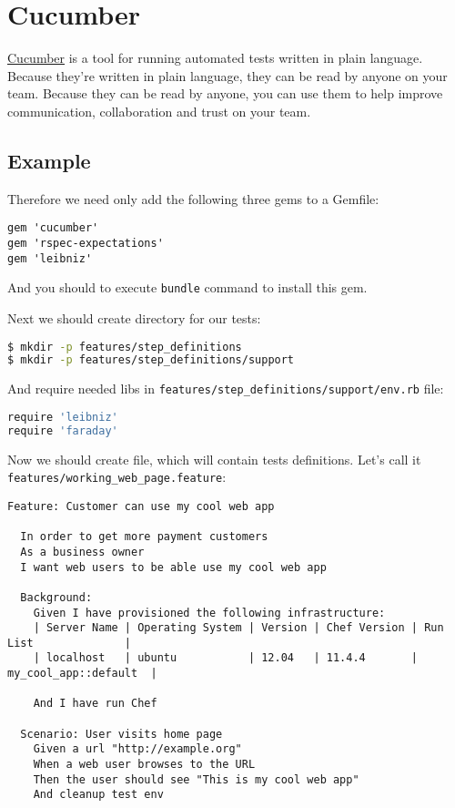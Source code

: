 \section{Cucumber}
\label{sec:testing-cucumber-spec}

\href{http://cukes.info/}{Cucumber} is a tool for running automated tests written in plain language. Because they're written in plain language, they can be read by anyone on your team. Because they can be read by anyone, you can use them to help improve communication, collaboration and trust on your team.

\subsection{Example}

Therefore we need only add the following three gems to a Gemfile:

\begin{lstlisting}[label=lst:testing-cucumber-spec1]
gem 'cucumber'
gem 'rspec-expectations'
gem 'leibniz'
\end{lstlisting}

And you should to execute \lstinline!bundle! command to install this gem.

Next we should create directory for our tests:

\begin{lstlisting}[language=Bash,label=lst:testing-cucumber-spec2]
$ mkdir -p features/step_definitions
$ mkdir -p features/step_definitions/support
\end{lstlisting}

And require needed libs in \lstinline!features/step_definitions/support/env.rb! file:

\begin{lstlisting}[language=Bash,label=lst:testing-cucumber-spec3]
require 'leibniz'
require 'faraday'
\end{lstlisting}

Now we should create file, which will contain tests definitions. Let's call it \lstinline!features/working_web_page.feature!:

\begin{lstlisting}[label=lst:testing-cucumber-spec4]
Feature: Customer can use my cool web app

  In order to get more payment customers
  As a business owner
  I want web users to be able use my cool web app

  Background:
    Given I have provisioned the following infrastructure:
    | Server Name | Operating System | Version | Chef Version | Run List              |
    | localhost   | ubuntu           | 12.04   | 11.4.4       | my_cool_app::default  |

    And I have run Chef

  Scenario: User visits home page
    Given a url "http://example.org"
    When a web user browses to the URL
    Then the user should see "This is my cool web app"
    And cleanup test env
\end{lstlisting}

